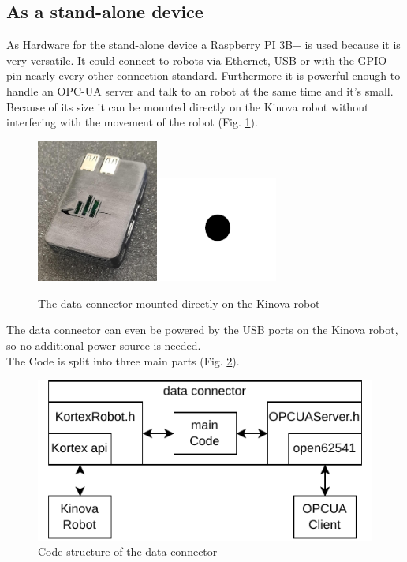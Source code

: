 \documentclass[conference]{IEEEtran}
\begin{document}
\subsection{As a stand-alone device}
As Hardware for the stand-alone device a Raspberry PI 3B+ is used because it is very versatile. It could connect to robots via Ethernet, USB or with the GPIO pin nearly every other connection standard.
Furthermore it is powerful enough to handle an OPC-UA server and talk to an robot at the same time and it's small.
Because of its size it can be mounted directly on the Kinova robot without interfering with the movement of the robot (Fig. \ref{fig:dataConectorPic}).
\begin{figure}[htbp]
    \centerline{\includegraphics[width=4cm]{Pictures/PiGehaeuseVorne.jpeg}\includegraphics[width=4cm]{Pictures/fig1.png}}
    \caption{The data connector mounted directly on the Kinova robot}
    \label{fig:dataConectorPic}
\end{figure}
The data connector can even be powered by the USB ports on the Kinova robot, so no additional power source is needed.\\
The Code is split into three main parts (Fig. \ref{fig:dataConectorStructure}).
\begin{figure}[htbp]
    \centerline{\includegraphics{Pictures/dataConectorStructure.pdf}}
    \caption{Code structure of the data connector}
    \label{fig:dataConectorStructure}
\end{figure}
\end{document}
